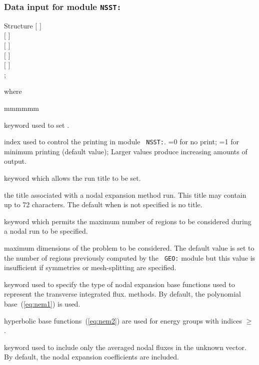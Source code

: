 \clearpage

\subsubsection{Data input for module {\tt NSST:}}\label{sect:NSST_data}

\begin{DataStructure}{Structure }
$[$   $]$ \\
$[$   $]$ \\
$[$   $]$ \\
$[$   $]$ \\
$[$  $]$ \\
;
\end{DataStructure}

\noindent where
\begin{ListeDeDescription}{mmmmmm}

\item[\moc{EDIT}] keyword used to set .

\item[\dusa{iprint}] index used to control the printing  in module {\tt
NSST:}. =0 for no print; =1 for minimum printing (default value); Larger
values produce increasing amounts of output.

\item[\moc{TITL}] keyword which allows the run title to be set.

\item[\dusa{TITLE}] the title associated with a nodal expansion method run. This
title may contain up to 72 characters. The default when  is not specified is no title.

\item[\moc{MAXR}] keyword which permits the maximum number of regions to be considered during a nodal run to be specified.

\item[\dusa{maxpts}] maximum dimensions of the problem to be considered.  The
default value is set to the number of regions previously computed by the {\tt
GEO:} module but this value is insufficient if symmetries or mesh-splitting
are specified.

\item[\moc{HYPE}] keyword used to specify the type of nodal expansion base functions used to represent the transverse integrated flux.
methods. By default, the polynomial base~(\ref{eq:nem1}) is used.

\item[\dusa{igmax}] hyperbolic base functions~(\ref{eq:nem2}) are used for energy groups with indices $\ge$ .

\item[\moc{LUMP}] keyword used to include only the averaged nodal fluxes in the unknown vector. By default, the nodal expansion coefficients are included.

\end{ListeDeDescription}

